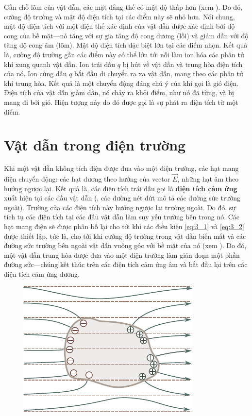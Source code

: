 Gần chỗ lõm của vật dẫn, các mặt đẳng thế có mật độ thấp hơn (xem ). Do đó, cường độ trường và mật độ điện tích tại các điểm này sẽ nhỏ hơn. Nói chung, mật độ điện tích với một điện thế xác định của vật dẫn được xác định bởi độ cong của bề mặt---nó tăng với sự gia tăng độ cong dương (lồi) và giảm dần với độ tăng độ cong âm (lõm). Mật độ điện tích đặc biệt lớn tại các điểm nhọn. Kết quả là, cường độ trường gần các điểm này có thể lớn tới nỗi làm ion hóa các phân tử khí xung quanh vật dẫn. Ion trái dấu $q$ bị hút về vật dẫn và trung hòa điện tích của nó. Ion cùng dấu $q$ bắt đầu di chuyển ra xa vật dẫn, mang theo các phân tử khí trung hòa. Kết quả là một chuyển động đáng chú ý của khí gọi là gió điện. Điện tích của vật dẫn giảm dần, nó chảy ra khỏi điểm, như nó đã từng, và bị mang đi bởi gió. Hiện tượng này do đó được gọi là sự phát ra điện tích từ một điểm.

\section{Vật dẫn trong điện trường}\label{sec:3_2}

Khi một vật dẫn không tích điện được đưa vào một điện trường, các hạt mang điện chuyển động: các hạt dương theo hướng của vector $\vec{E}$, những hạt âm theo hướng ngược lại. Kết quả là, các điện tích trái dấu gọi là \textbf{điện tích cảm ứng} xuất hiện tại các đầu vật dẫn (, các đường nét đứt mô tả các đường sức trường ngoài). Trường của các điện tích này hướng ngược lại trường ngoài. Do đó, sự tích tụ các điện tích tại các đầu vật dẫn làm suy yếu trường bên trong nó. Các hạt mang điện sẽ được phân bố lại cho tới khi các điều kiện \eqref{eq:3_1} và \eqref{eq:3_2} được thiết lập, tức là, cho tới khi cường độ trường trong vật dẫn biến mất và các đường sức trường bên ngoài vật dẫn vuông góc với bề mặt của nó (xem ). Do đó, một vật dẫn trung hòa được đưa vào một điện trường làm gián đoạn một phần đường sức---chúng kết thúc trên các điện tích cảm ứng âm và bắt đầu lại trên các điện tích cảm ứng dương.

\begin{figure}[!htb]
	\begin{center}
		\includegraphics[scale=1]{figures/ch_03/fig_3_4.pdf}
		\caption[]{}
		\label{fig:3_4}
	\end{center}
	\vspace{-0.8cm}
\end{figure}

